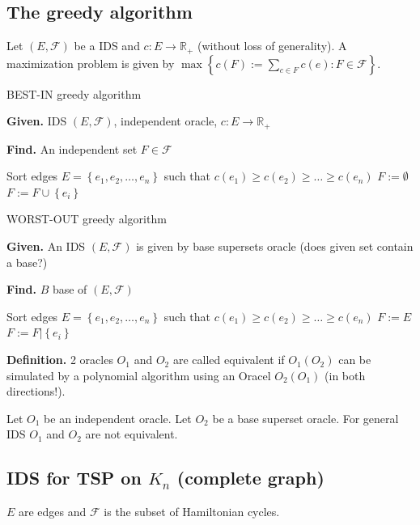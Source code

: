 \documentclass[a4paper]{article}
\theoremstyle{definition}
\newcommand{\set}[1]{\left\{#1\right\}}
\newcommand{\given}[1]{\textbf{Given.} #1\par}
\newcommand{\find}[1]{\textbf{Find.} #1\par}
\begin{document}
\subsection{The greedy algorithm}
%
Let $(E, \mathcal{F})$ be a IDS and $c: E \rightarrow \mathbb{R}_+$ (without loss of generality).
A maximization problem is given by $\max\set{c(F) := \sum_{c \in F} c(e): F \in \mathcal{F}}$.

\begin{algorithm}
  \caption{BEST-IN greedy algorithm}
  \label{greedy-algorithm}
  \given{IDS $(E, \mathcal{F})$, independent oracle, $c: E \rightarrow \mathbb{R}_+$}
  \find{An independent set $F \in \mathcal{F}$}
\begin{algorithmic}[1]
  \State Sort edges $E = \set{e_1, e_2, \ldots, e_n}$ such that $c(e_1) \geq c(e_2) \geq \ldots \geq c(e_n)$
  \State $F := \emptyset$
    \If{$F \cup \set{e_i} \in \mathcal{F}$}
      \State $F := F \cup \set{e_i}$
    \EndIf
  \EndFor
\end{algorithmic}
\end{algorithm}

\begin{algorithm}
  \caption{WORST-OUT greedy algorithm}
  \label{worst-out-greedy-algorithm}
  \given{An IDS $(E, \mathcal{F})$ is given by base supersets oracle (does given set contain a base?)}
  \find{$B$ base of $(E, \mathcal{F})$}
\begin{algorithmic}[1]
  \State Sort edges $E = \set{e_1, e_2, \ldots, e_n}$ such that $c(e_1) \geq c(e_2) \geq \ldots \geq c(e_n)$
  \State $F := E$
    \If{$F | \set{e_i}$ contains base}
      \State $F := F | \set{e_i}$
    \EndIf
  \EndFor
\end{algorithmic}
\end{algorithm}

\textbf{Definition.}
  2 oracles $O_1$ and $O_2$ are called equivalent if $O_1(O_2)$ can be simulated by a polynomial algorithm using an Oracel $O_2(O_1)$ (in both directions!).

  Let $O_1$ be an independent oracle. Let $O_2$ be a base superset oracle.
  For general IDS $O_1$ and $O_2$ are not equivalent.

\subsection[IDS for TSP]{IDS for TSP on $K_n$ (complete graph)}
%
$E$ are edges and $\mathcal{F}$ is the subset of Hamiltonian cycles.
\end{document}

